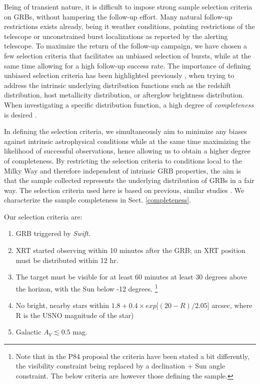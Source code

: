 \documentclass{aa}    %
\begin{document}
Being of transient nature, it is difficult to impose strong sample selection
criteria on GRBs, without hampering the follow-up effort. Many natural follow-up
restrictions exists already, being it weather conditions, pointing restrictions
of the telescope or unconstrained burst localizations as reported by the alerting
telescope. To maximize the return of the follow-up campaign, we have chosen a
few selection criteria that facilitates an unbiased selection of bursts, while
at the same time allowing for a high follow-up success rate. The importance of
defining unbiased selection criteria has been highlighted previously
\citep{Jakobsson2006b, Salvaterra2012, Hjorth2012, Vergani2015, Perley2016a},
when trying to address the intrinsic underlying distribution functions such as
the redshift distribution, host metallicity distribution, or afterglow
brightness distribution. When investigating a specific distribution function, a
high degree of \textit{completeness} is desired \citep[e.g.,][]{Perley2016b}.

In defining the selection criteria, we simultaneously aim to minimize any biases
against intrinsic astrophysical conditions while at the same time maximizing the
likelihood of successful observations, hence allowing us to obtain a higher
degree of completeness. By restricting the selection criteria to conditions
local to the Milky Way and therefore independent of intrinsic GRB properties,
the aim is that the sample collected represents the underlying distribution of
GRBs in a fair way. The selection criteria used here is based on previous,
similar studies \citep{Jakobsson2006b, Fynbo2009, Hjorth2012}. We characterize
the sample completeness in Sect. \ref{completeness}.

Our selection criteria are:

\begin{enumerate}
	\item GRB triggered by \textit{Swift}.
	\item XRT started observing within 10 minutes after the GRB; an XRT position must be distributed within 12 hr.
	\item The target must be visible for at least 60 minutes at least 30 degrees above the horizon, with the Sun below -12 degrees.
	\footnote{Note that in the P84 proposal the criteria have
	been stated a bit differently, the visibility constraint being replaced by a
	declination + Sun angle constraint. The below criteria are however those
	defining the sample.}
	\item No bright, nearby stars within $ 1.8 + 0.4 \times exp[(20 - R)/2.05$] arcsec, where R is the USNO magnitude of the star)
	\item Galactic $A_V \lesssim 0.5$ mag.
\end{enumerate}
\end{document}
